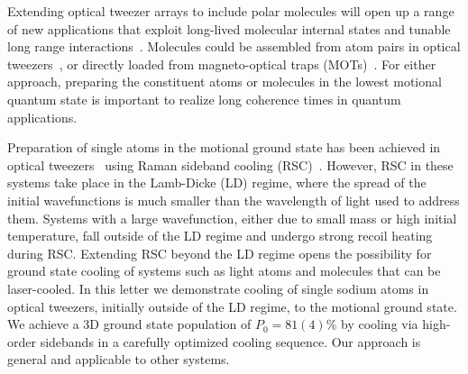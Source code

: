 \documentclass[aps,prl,twocolumn,groupedaddress]{revtex4-1}
\begin{document}
Extending optical tweezer arrays  to include polar molecules will open up a  range of
new applications that exploit  long-lived molecular internal states
and  tunable long range interactions~\cite{DeMille2002,Gorshkov2011,Yan2013}.
Molecules could be assembled from atom pairs in  optical tweezers~\cite{Liu2017},
or directly loaded from magneto-optical traps
(MOTs)~\cite{Barry2014,Truppe2017SubDoppler,Anderegg2017}.
For either approach, preparing the constituent atoms or molecules in the lowest motional
quantum state is important to realize long coherence times in quantum applications.

Preparation of single atoms in the motional ground state has been achieved in optical tweezers~\cite{Kaufman2012,Thompson2013,Liu2017,Robens2017}
 using Raman sideband cooling (RSC)~\cite{Monroe1995,Kerman2000,Han2000}.
However, RSC in these systems take place in the Lamb-Dicke (LD) regime, where
the spread of the initial wavefunctions is much smaller than the wavelength of light used to address them.
Systems with a large wavefunction, either due to small mass or high initial temperature,
fall outside of the LD regime and undergo strong recoil heating during RSC.
Extending RSC beyond the LD regime opens  the possibility
for ground state cooling of systems such as light atoms and %
molecules that can be laser-cooled.
In this letter we demonstrate cooling of single sodium atoms in optical tweezers,
initially outside of the LD regime, to the motional ground state.
We achieve a 3D ground state population of $P_0=81(4)$\% by  cooling via
 high-order sidebands in a carefully optimized cooling sequence.
Our approach is general and applicable to %
other systems.
\end{document}
